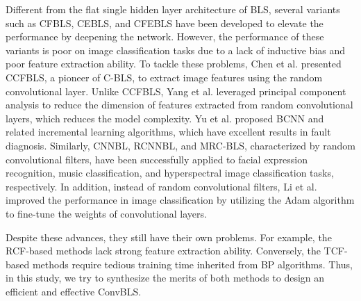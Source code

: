 \documentclass[lettersize,journal]{IEEEtran}
\begin{document}
Different from the flat single hidden layer architecture of BLS, several variants\cite{chen2018universal} such as CFBLS, CEBLS, and CFEBLS have been developed to elevate the performance by deepening the network. However, the performance of these variants is poor on image classification tasks due to a lack of inductive bias and poor feature extraction ability. To tackle these problems, Chen et al. \cite{chen2018universal} presented CCFBLS, a pioneer of C-BLS, to extract image features using the random convolutional layer. Unlike CCFBLS, Yang et al. \cite{yang2018cnn} leveraged principal component analysis to reduce the dimension of features extracted from random convolutional layers, which reduces the model complexity. Yu et al. \cite{yu2019broad} proposed BCNN and related incremental learning algorithms, which have excellent results in fault diagnosis. Similarly, CNNBL\cite{chen2020cnn}, RCNNBL\cite{tang2020combining}, and MRC-BLS\cite{ma2021multiscale}, characterized by random convolutional filters, have been successfully applied to facial expression recognition, music classification, and hyperspectral image classification tasks, respectively. In addition, instead of random convolutional filters, Li et al.\cite{li2019cnn} improved the performance in image classification by utilizing the Adam algorithm\cite{DBLP:journals/corr/KingmaB14} to fine-tune the weights of convolutional layers. 

Despite these advances, they still have their own problems. For example, the RCF-based methods\cite{chen2018universal, yang2018cnn, yu2019broad, chen2020cnn, tang2020combining, ma2021multiscale} lack strong feature extraction ability. Conversely, the TCF-based methods\cite{li2019cnn} require tedious training time inherited from BP algorithms. Thus, in this study, we try to synthesize the merits of both methods to design an efficient and effective ConvBLS.
\end{document}
